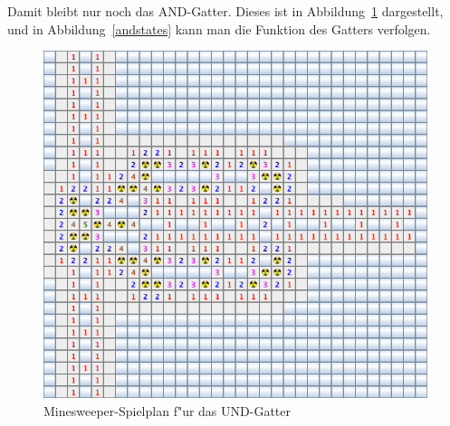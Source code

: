 Damit bleibt nur noch das AND-Gatter. Dieses ist in Abbildung~\ref{andgate}
dargestellt, und in Abbildung~\ref{andstates} kann man die Funktion des
Gatters verfolgen.

\begin{figure}
\begin{center}
\includegraphics[width=0.55\hsize]{graphics/and}
\end{center}
\caption{Minesweeper-Spielplan f"ur das UND-Gatter\label{andgate}}
\end{figure}%
